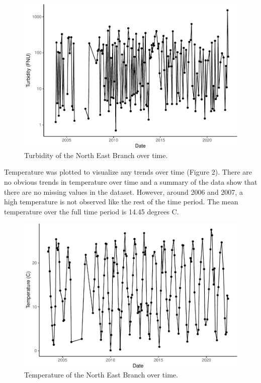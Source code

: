 \documentclass[
  12pt,
]{article}
\begin{document}
\begin{figure}

\includegraphics{Project_Template_files/figure-latex/Turbidity over time-1} \hfill{}

\caption{Turbidity of the North East Branch over time.}\label{fig:Turbidity over time}
\end{figure}

\newpage

Temperature was plotted to visualize any trends over time (Figure 2).
There are no obvious trends in temperature over time and a summary of
the data show that there are no missing values in the dataset. However,
around 2006 and 2007, a high temperature is not observed like the rest
of the time period. The mean temperature over the full time period is
14.45 degrees C.

\begin{figure}

\includegraphics{Project_Template_files/figure-latex/Temperature over time-1} \hfill{}

\caption{Temperature of the North East Branch over time.}\label{fig:Temperature over time}
\end{figure}
\end{document}
